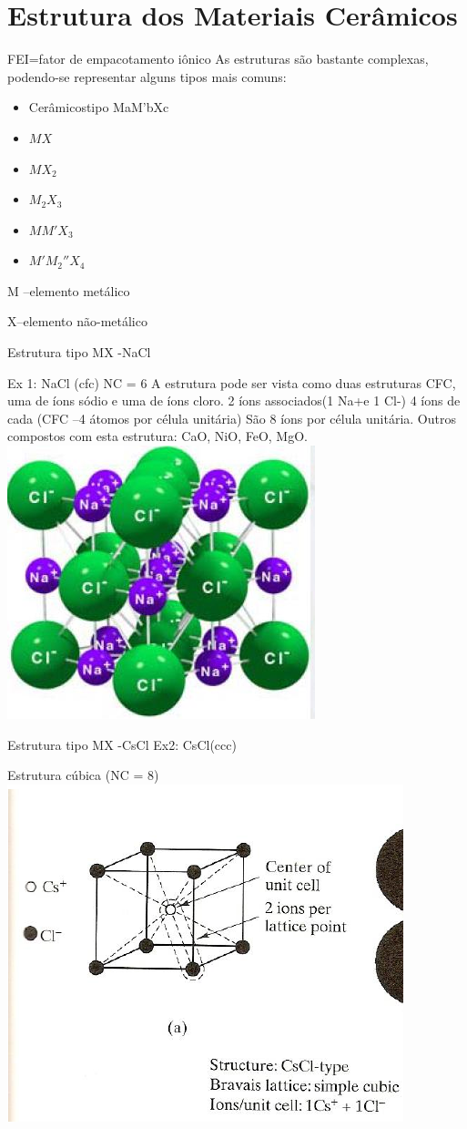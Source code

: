 \section{Estrutura dos Materiais Cerâmicos}
FEI=fator de empacotamento iônico
As estruturas são bastante complexas, podendo-se representar alguns tipos mais comuns:


\begin{itemize}
	\item Cerâmicostipo MaM’bXc
	\item $MX$
	\item $MX_{2}$
	\item $M_{2}X_{3}$
	\item $MM'X_{3}$
	\item $M'M_{2}''X_{4}$
\end{itemize}

M –elemento metálico

X–elemento não-metálico



Estrutura tipo MX -NaCl

Ex 1: NaCl (cfc)
NC = 6
A estrutura pode ser vista como duas estruturas CFC, uma de íons sódio e uma de íons cloro.
2 íons associados(1 Na+e 1 Cl-)
4 íons de cada (CFC –4 átomos por célula unitária)
São 8 íons por célula unitária.
Outros compostos com esta estrutura: CaO, NiO, FeO, MgO.
 \includegraphics[scale=0.5,trim={0 0 0 0}]{figures/NaCl}


Estrutura tipo MX -CsCl
Ex2: CsCl(ccc)

Estrutura cúbica (NC = 8)
 \includegraphics[scale=0.5,trim={0 0 0 0}]{figures/CsCl}
 
